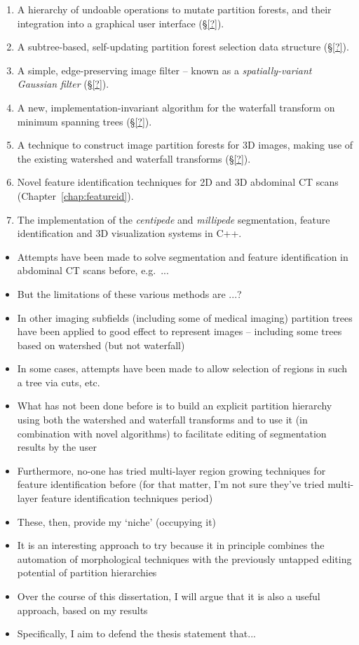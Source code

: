 \begin{enumerate}
\item A hierarchy of undoable operations to mutate partition forests, and their integration into a graphical user interface (\S\ref{?}).
\item A subtree-based, self-updating partition forest selection data structure (\S\ref{?}).
\item A simple, edge-preserving image filter -- known as a \emph{spatially-variant Gaussian filter} (\S\ref{?}).
\item A new, implementation-invariant algorithm for the waterfall transform on minimum spanning trees (\S\ref{?}).
\item A technique to construct image partition forests for 3D images, making use of the existing watershed and waterfall transforms (\S\ref{?}).
\item Novel feature identification techniques for 2D and 3D abdominal CT scans (Chapter~\ref{chap:featureid}).
\item The implementation of the \emph{centipede} and \emph{millipede} segmentation, feature identification and 3D visualization systems in C++.
\end{enumerate}

\iffalse

\begin{itemize}

\item Attempts have been made to solve segmentation and feature identification in abdominal CT scans before, e.g.~...
\item But the limitations of these various methods are ...?
\item In other imaging subfields (including some of medical imaging) partition trees have been applied to good effect to represent images -- including some trees based on watershed (but not waterfall)
\item In some cases, attempts have been made to allow selection of regions in such a tree via cuts, etc.
\item What has not been done before is to build an explicit partition hierarchy using both the watershed and waterfall transforms and to use it (in combination with novel algorithms) to facilitate editing of segmentation results by the user
\item Furthermore, no-one has tried multi-layer region growing techniques for feature identification before (for that matter, I'm not sure they've tried multi-layer feature identification techniques period)
\item These, then, provide my `niche' (occupying it)
\item It is an interesting approach to try because it in principle combines the automation of morphological techniques with the previously untapped editing potential of partition hierarchies
\item Over the course of this dissertation, I will argue that it is also a useful approach, based on my results
\item Specifically, I aim to defend the thesis statement that...

\end{itemize}

